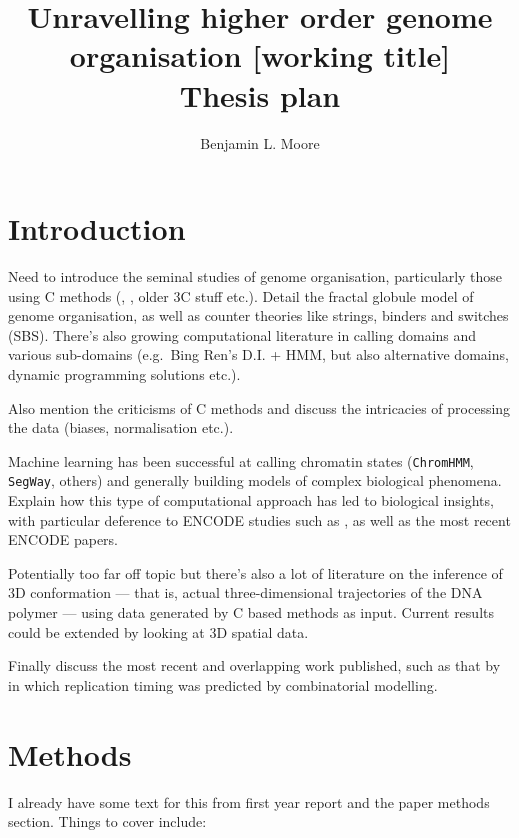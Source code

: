 \documentclass[a4paper,10pt,oneside]{book}
\title{ \vspace{3in} Unravelling higher order genome organisation {\small [working
    title]} \\ \vspace{2em} {\large {\bf Thesis plan}} }
\author{Benjamin L. Moore}
\begin{document}
\maketitle

\chapter{Introduction}

Need to introduce the seminal studies of genome organisation,
particularly those using C methods (\citet{Lieberman2011},
\citet{Dixon2012}, older 3C stuff\citep{VanSteensel2010} etc.). Detail
the fractal globule\citep{Lieberman2011} model of genome organisation,
as well as counter theories like strings, binders and switches
(SBS)\citep{Barbieri2012}. There's also growing computational literature
in calling domains and various sub-domains (e.g.~Bing Ren's D.I. +
HMM\citep{Dixon2012}, but also alternative domains\citep{Filippova2014},
dynamic programming solutions\citep{Levy-Leduc2014} etc.).

Also mention the criticisms of C
methods\cite{Gavrilov2013, Gavrilov2013a} and discuss the intricacies of
processing the data (biases,\citep{Yaffe2011}
normalisation\citep{Imakaev2012, Hu2012, Hu2013} etc.).

Machine learning has been successful at calling chromatin states
(\texttt{ChromHMM}, \texttt{SegWay}, others) and generally building
models of complex biological phenomena. Explain how this type of
computational approach has led to biological insights, with particular
deference to ENCODE studies such as \citet{Dong2012}, as well as the
most recent ENCODE papers.

Potentially too far off topic but there's also a lot of literature on
the inference of 3D
conformation\cite{Varoquaux2014a, Ay2014b, Dekker2013, Bau2011a, Hu2013a}
--- that is, actual three-dimensional trajectories of the DNA polymer
--- using data generated by C based methods as input. Current results
could be extended by looking at 3D spatial data.

Finally discuss the most recent and overlapping work published, such as
that by \citet{Comoglio2014} in which replication timing was predicted
by combinatorial modelling.

\chapter{Methods}

I already have some text for this from first year report and the paper
methods section. Things to cover include:
\end{document}
